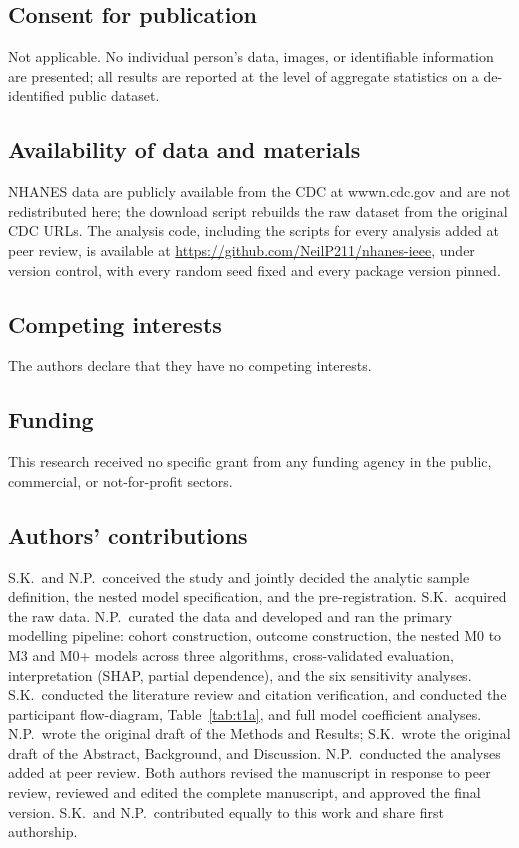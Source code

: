 \documentclass[12pt]{article}
\begin{document}
\subsection*{Consent for publication}

Not applicable. No individual person's data, images, or identifiable information are presented; all results are reported at the level of aggregate statistics on a de-identified public dataset.

\subsection*{Availability of data and materials}

NHANES data are publicly available from the CDC at wwwn.cdc.gov and are not redistributed here; the download script rebuilds the raw dataset from the original CDC URLs. The analysis code, including the scripts for every analysis added at peer review, is available at \url{https://github.com/NeilP211/nhanes-ieee}, under version control, with every random seed fixed and every package version pinned.

\subsection*{Competing interests}

The authors declare that they have no competing interests.

\subsection*{Funding}

This research received no specific grant from any funding agency in the public, commercial, or not-for-profit sectors.

\subsection*{Authors' contributions}

S.K.\ and N.P.\ conceived the study and jointly decided the analytic sample definition, the nested model specification, and the pre-registration. S.K.\ acquired the raw data. N.P.\ curated the data and developed and ran the primary modelling pipeline: cohort construction, outcome construction, the nested M0 to M3 and M0+ models across three algorithms, cross-validated evaluation, interpretation (SHAP, partial dependence), and the six sensitivity analyses. S.K.\ conducted the literature review and citation verification, and conducted the participant flow-diagram, Table~\ref{tab:t1a}, and full model coefficient analyses. N.P.\ wrote the original draft of the Methods and Results; S.K.\ wrote the original draft of the Abstract, Background, and Discussion. N.P.\ conducted the analyses added at peer review. Both authors revised the manuscript in response to peer review, reviewed and edited the complete manuscript, and approved the final version. S.K.\ and N.P.\ contributed equally to this work and share first authorship.
\end{document}
